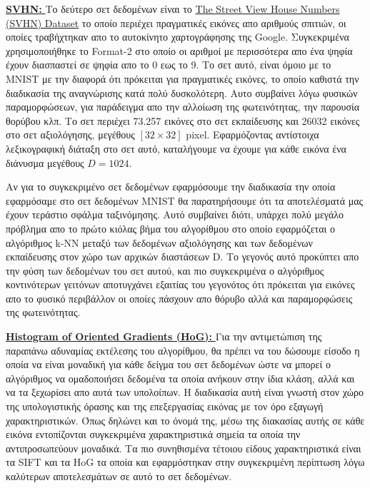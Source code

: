 \par
\href{http://ufldl.stanford.edu/housenumbers/}{\textbf{\textlatin{SVHN: }}}Το δεύτερο σετ δεδομένων είναι το \href{http://ufldl.stanford.edu/housenumbers/}{\textlatin{The Street View House Numbers (SVHN) Dataset}}\cite{12} το οποίο περιέχει πραγματικές εικόνες απο αριθμούς σπιτιών, οι οποίες τραβήχτηκαν απο το αυτοκίνητο χαρτογράφησης της \textlatin{Google}. Συγκεκριμένα χρησιμοποιήθηκε το \textlatin{Format-2} στο οποίο οι αριθμοί με περισσότερα απο ένα ψηφία έχουν διασπαστεί σε ψηφία απο το 0 εως το 9. Το σετ αυτό, είναι όμοιο με το \textlatin{MNIST} με την διαφορά ότι πρόκειται για πραγματικές εικόνες, το οποίο καθιστά την διαδικασία της αναγνώρισης κατά πολύ δυσκολότερη. Αυτο συμβαίνει λόγω φυσικών παραμορφώσεων, για παράδειγμα απο την αλλοίωση της φωτεινότητας, την παρουσία θορύβου κλπ. Το σετ περιέχει 73.257 εικόνες στο σετ εκπαίδευσης και 26032 εικόνες στο σετ αξιολόγησης, μεγέθους $[32 \times 32]$ \textlatin{pixel}. Εφαρμόζοντας αντίστοιχα λεξικογραφική διάταξη στο σετ αυτό, καταλήγουμε να έχουμε για κάθε εικόνα ένα διάνυσμα μεγέθους $D = 1024$. 
\par
Αν για το συγκεκριμένο σετ δεδομένων εφαρμόσουμε την διαδικασία την οποία εφαρμόσαμε στο σετ δεδομένων \textlatin{MNIST} θα παρατηρήσουμε ότι τα αποτελέσματά μας έχουν τεράστιο σφάλμα ταξινόμησης. Αυτό συμβαίνει διότι, υπάρχει πολύ μεγάλο πρόβλημα απο το πρώτο κιόλας βήμα του αλγορίθμου στο οποίο εφαρμόζεται ο αλγόριθμος \textlatin{k-NN} μεταξύ των δεδομένων αξιολόγησης και των δεδομένων εκπαίδευσης στον χώρο των αρχικών διαστάσεων \textlatin{D}. Το γεγονός αυτό προκύπτει απο την φύση των δεδομένων του σετ αυτού, και πιο συγκεκριμένα ο αλγόριθμος κοντινότερων γειτόνων αποτυγχάνει εξαιτίας του γεγονότος ότι πρόκειται για εικόνες απο το φυσικό περιβάλλον οι οποίες πάσχουν απο θόρυβο αλλά και παραμορφώσεις της φωτεινότητας. 
\par
\href{https://en.wikipedia.org/wiki/Histogram_of_oriented_gradients}{\textbf{\textlatin{Histogram of Oriented Gradients (HoG): }}} Για την αντιμετώπιση της παραπάνω αδυναμίας εκτέλεσης του αλγορίθμου, θα πρέπει να του δώσουμε είσοδο η οποία να είναι μοναδική για κάθε δείγμα του σετ δεδομένων ώστε να μπορεί ο αλγόριθμος να ομαδοποιήσει δεδομένα τα οποία ανήκουν στην ίδια κλάση, αλλά και να τα ξεχωρίσει απο αυτά των υπολοίπων. Η διαδικασία αυτή είναι γνωστή στον χώρο της υπολογιστικής όρασης και της επεξεργασίας εικόνας με τον όρο εξαγωγή χαρακτηριστικών. Όπως δηλώνει και το όνομά της, μέσω της διακασίας αυτής σε κάθε εικόνα εντοπίζονται συγκεκριμένα χαρακτηριστικά σημεία τα οποία την αντιπροσωπεύουν μοναδικά. Τα πιο συνηθισμένα τέτοιου είδους χαρακτηριστικά είναι τα \textlatin{SIFT} και τα \textlatin{HoG} τα οποία και εφαρμόστηκαν στην συγκεκριμένη περίπτωση λόγω καλύτερων αποτελεσμάτων σε αυτό το σετ δεδομένων. 
